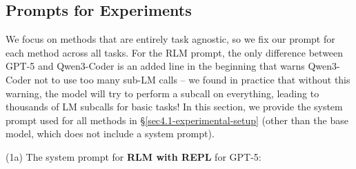 \subsection{Prompts for Experiments}
We focus on methods that are entirely task agnostic, so we fix our prompt for each method across all tasks. For the RLM prompt, the only difference between GPT-5 and Qwen3-Coder is an added line in the beginning that warns Qwen3-Coder not to use too many sub-LM calls -- we found in practice that without this warning, the model will try to perform a subcall on everything, leading to thousands of LM subcalls for basic tasks! In this section, we provide the system prompt used for all methods in \S\ref{sec4.1-experimental-setup} (other than the base model, which does not include a system prompt).

\noindent (1a) The system prompt for \textbf{RLM with REPL} for GPT-5:
